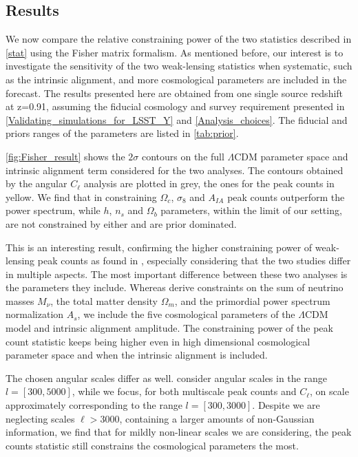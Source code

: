 \documentclass{aa}
\begin{document}
\subsection{Results} 
We now compare the relative constraining power of the two statistics described in \autoref{stat} using the Fisher matrix formalism. 
As mentioned before, our interest is to investigate the sensitivity of the two weak-lensing statistics when systematic, such as the intrinsic alignment, and more cosmological parameters are included in the forecast. 
The results presented here are obtained from one single source redshift at z=0.91, assuming the fiducial cosmology and survey requirement presented in \autoref{Validating_simulations_for_LSST_Y} and \autoref{Analysis_choices}. The fiducial and priors ranges of the parameters are listed in \autoref{tab:prior}.


\autoref{fig:Fisher_result} shows the $2\sigma$ contours on the full $\Lambda$CDM parameter space and intrinsic alignment term considered for the two analyses. 
The contours obtained by the angular $C_{\ell}$ analysis are plotted in grey, the ones for the peak counts in yellow. 
We find that in constraining $\Omega_c$, $\sigma_8$ and $A_{IA}$ peak counts outperform the power spectrum, while $h$, $n_s$ and $\Omega_b$ parameters, within the limit of our setting, are not constrained by either and are prior dominated.

This is an interesting result, confirming the higher constraining power of weak-lensing peak counts as found in \cite{ajani2020constraining}, especially considering that the two studies differ in multiple aspects. 
The most important difference between these two analyses is the parameters they include. Whereas \cite{ajani2020constraining} derive constraints on the sum of neutrino masses $M_{\nu}$, the total matter density $\Omega_m$, and the primordial power spectrum normalization $A_s$, we include the five cosmological parameters of the $\Lambda$CDM model and intrinsic alignment amplitude. 
The constraining power of the peak count statistic keeps being higher even in high dimensional cosmological parameter space and when the intrinsic alignment is included. 

The chosen angular scales differ as well. \cite{ajani2020constraining} consider angular scales in the range $l = [300,5000]$, while we focus, for both multiscale peak counts and $C_{\ell}$, on scale approximately corresponding to the range $l = [300,3000]$. Despite we are neglecting scales $\ell>3000$, containing a larger amounts of
non-Gaussian information, we find that for mildly non-linear scales we are considering, the peak counts statistic still constrains the cosmological parameters the most. 
\end{document}
